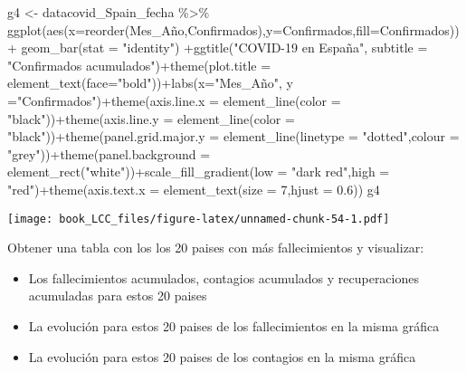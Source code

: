 \documentclass[
]{book}
\newenvironment{Shaded}{\begin{snugshade}}{\end{snugshade}}
\newcommand{\AttributeTok}[1]{\textcolor[rgb]{0.77,0.63,0.00}{#1}}
\newcommand{\DecValTok}[1]{\textcolor[rgb]{0.00,0.00,0.81}{#1}}
\newcommand{\FloatTok}[1]{\textcolor[rgb]{0.00,0.00,0.81}{#1}}
\newcommand{\FunctionTok}[1]{\textcolor[rgb]{0.00,0.00,0.00}{#1}}
\newcommand{\NormalTok}[1]{#1}
\newcommand{\OtherTok}[1]{\textcolor[rgb]{0.56,0.35,0.01}{#1}}
\newcommand{\SpecialCharTok}[1]{\textcolor[rgb]{0.00,0.00,0.00}{#1}}
\newcommand{\StringTok}[1]{\textcolor[rgb]{0.31,0.60,0.02}{#1}}
\providecommand{\tightlist}{%
  \setlength{\itemsep}{0pt}\setlength{\parskip}{0pt}}
\begin{document}
\begin{Shaded}
\begin{Highlighting}[]
\NormalTok{ g4 }\OtherTok{\textless{}{-}}\NormalTok{ datacovid\_Spain\_fecha }\SpecialCharTok{\%\textgreater{}\%}
     \FunctionTok{ggplot}\NormalTok{(}\FunctionTok{aes}\NormalTok{(}\AttributeTok{x=}\FunctionTok{reorder}\NormalTok{(Mes\_Año,Confirmados),}\AttributeTok{y=}\NormalTok{Confirmados,}\AttributeTok{fill=}\NormalTok{Confirmados)) }\SpecialCharTok{+}  \FunctionTok{geom\_bar}\NormalTok{(}\AttributeTok{stat =} \StringTok{"identity"}\NormalTok{) }\SpecialCharTok{+}\FunctionTok{ggtitle}\NormalTok{(}\StringTok{"COVID{-}19 en España"}\NormalTok{, }\AttributeTok{subtitle =} \StringTok{"Confirmados acumulados"}\NormalTok{)}\SpecialCharTok{+}\FunctionTok{theme}\NormalTok{(}\AttributeTok{plot.title =} \FunctionTok{element\_text}\NormalTok{(}\AttributeTok{face=}\StringTok{"bold"}\NormalTok{))}\SpecialCharTok{+}\FunctionTok{labs}\NormalTok{(}\AttributeTok{x=}\StringTok{"Mes\_Año"}\NormalTok{, }\AttributeTok{y =}\StringTok{"Confirmados"}\NormalTok{)}\SpecialCharTok{+}\FunctionTok{theme}\NormalTok{(}\AttributeTok{axis.line.x =} \FunctionTok{element\_line}\NormalTok{(}\AttributeTok{color =} \StringTok{"black"}\NormalTok{))}\SpecialCharTok{+}\FunctionTok{theme}\NormalTok{(}\AttributeTok{axis.line.y =} \FunctionTok{element\_line}\NormalTok{(}\AttributeTok{color =} \StringTok{"black"}\NormalTok{))}\SpecialCharTok{+}\FunctionTok{theme}\NormalTok{(}\AttributeTok{panel.grid.major.y =} \FunctionTok{element\_line}\NormalTok{(}\AttributeTok{linetype =} \StringTok{"dotted"}\NormalTok{,}\AttributeTok{colour =} \StringTok{"grey"}\NormalTok{))}\SpecialCharTok{+}\FunctionTok{theme}\NormalTok{(}\AttributeTok{panel.background =} \FunctionTok{element\_rect}\NormalTok{(}\StringTok{"white"}\NormalTok{))}\SpecialCharTok{+}\FunctionTok{scale\_fill\_gradient}\NormalTok{(}\AttributeTok{low =} \StringTok{"dark red"}\NormalTok{,}\AttributeTok{high =} \StringTok{"red"}\NormalTok{)}\SpecialCharTok{+}\FunctionTok{theme}\NormalTok{(}\AttributeTok{axis.text.x =} \FunctionTok{element\_text}\NormalTok{(}\AttributeTok{size =} \DecValTok{7}\NormalTok{,}\AttributeTok{hjust =} \FloatTok{0.6}\NormalTok{))}
\NormalTok{g4}
\end{Highlighting}
\end{Shaded}

\texttt{[image: book\_LCC\_files/figure-latex/unnamed-chunk-54-1.pdf]}

Obtener una tabla con los los 20 paises con más fallecimientos y visualizar:

\begin{itemize}
\tightlist
\item
  Los fallecimientos acumulados, contagios acumulados y recuperaciones acumuladas para estos 20 paises
\item
  La evolución para estos 20 paises de los fallecimientos en la misma gráfica
\item
  La evolución para estos 20 paises de los contagios en la misma gráfica
\end{itemize}
\end{document}
